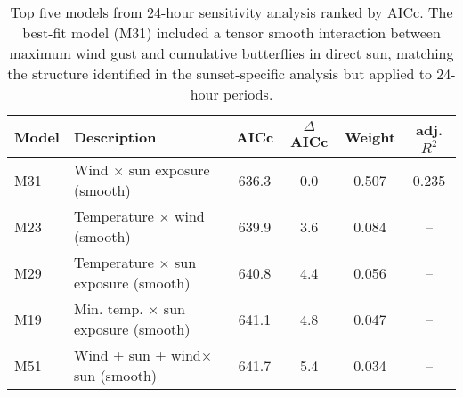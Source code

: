 \begin{table}[htbp]
\centering
\caption{Top five models from 24-hour sensitivity analysis ranked by AICc. The best-fit model (M31) included a tensor smooth interaction between maximum wind gust and cumulative butterflies in direct sun, matching the structure identified in the sunset-specific analysis but applied to 24-hour periods.}
\label{tab:24hr-model-selection-table}
\begin{tabularx}{\textwidth}{lXcccc}
\toprule
Model & Description & AICc & $\Delta$AICc & Weight & adj. $R^2$ \\
\midrule
M31 & Wind $\times$ sun exposure (smooth) & 636.3 & 0.0 & 0.507 & 0.235 \\
M23 & Temperature $\times$ wind (smooth) & 639.9 & 3.6 & 0.084 & -- \\
M29 & Temperature $\times$ sun exposure (smooth) & 640.8 & 4.4 & 0.056 & -- \\
M19 & Min. temp. $\times$ sun exposure (smooth) & 641.1 & 4.8 & 0.047 & -- \\
M51 & Wind + sun + wind$\times$sun (smooth) & 641.7 & 5.4 & 0.034 & -- \\
\bottomrule
\end{tabularx}
\end{table}